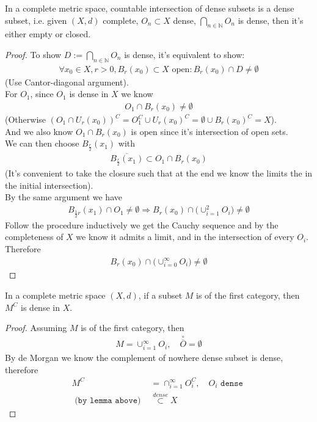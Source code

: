 \begin{theorem}
	In a complete metric space, countable intersection of dense subsets is a dense subset, i.e. given $(X, d)$ complete, $O_n \subset X$ dense, $\bigcap_{n \in \mathbb{N}} O_n$ is dense, then it's either empty or closed. 
\end{theorem}
\begin{proof}
	To show $D:= \bigcap_{n \in \mathbb{N}} O_n$ is dense, it's equivalent to show:
	\begin{align*}
		\forall x_0 \in X, r > 0, B_r(x_0) \subset X \text{ open}: B_r(x_0) \cap D \neq \emptyset 
	\end{align*}
	(Use Cantor-diagonal argument).\\
	For $O_1$, since $O_1$ is dense in $X$ we know 
	\begin{align*}
		O_1 \cap B_r(x_0) \neq \emptyset
	\end{align*}
	(Otherwise $(O_1 \cap U_r(x_0))^C = O_1^C \cup U_r(x_0)^C = \emptyset \cup B_r(x_0)^C = X$).\\
	And we also know $O_1 \cap B_r(x_0)$ is open since it's intersection of open sets.\\
	We can then choose $B_{\frac{r}{2}}(x_1)$ with
	\begin{align*}
		\overline{B_{\frac{r}{2}}(x_1)} \subset O_1 \cap B_r(x_0)
	\end{align*}
	(It's convenient to take the closure such that at the end we know the limits the in the initial intersection).\\
	By the same argument we have
	\begin{align*}
		B_{\frac{1}{2} r}(x_1) \cap O_1 \neq \emptyset \Rightarrow B_r(x_0) \cap \bigg( \cup_{i= 1}^2 O_i \bigg) \neq \emptyset
	\end{align*}
	Follow the procedure inductively we get the Cauchy sequence and by the completeness of $X$ we know it admits a limit, and in the intersection of every $O_i$. Therefore
	\begin{align*}
		B_r(x_0) \cap \bigg( \cup_{i = 0}^\infty O_i \bigg) \neq \emptyset
	\end{align*}
\end{proof}

\begin{corollary}
	In a complete metric space $(X, d)$, if a subset $M$ is of the first category, then $M^C$ is dense in $X$.
\end{corollary}
\begin{proof}
	Assuming $M$ is of the first category, then 
	\begin{align*}
		M = \cup_{i = 1}^\infty O_i, \quad \overset{\circ}{\overline{O}} = \emptyset
	\end{align*}
	By de Morgan we know the complement of nowhere dense subset is dense, therefore
	\begin{align*}
		M^C &= \cap_{ i= 1}^\infty O_i^C, \quad O_i \texttt{ dense }\\
		\texttt{ (by lemma above) } 
		& \overset{dense}{\subset} X 
	\end{align*}
\end{proof}

